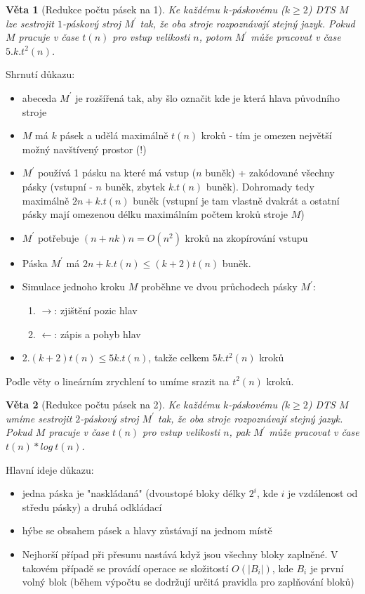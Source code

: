 \documentclass[a4paper]{article}      %
\newtheorem{theorem}{Věta}[section]
\newenvironment{proof}[1][Důkaz]{\begin{trivlist}
\item[\hskip \labelsep {\bfseries #1}]}{\end{trivlist}}
\begin{document}
\begin{theorem}[Redukce počtu pásek na 1]
Ke každému $k$-páskovému ($k \geq 2$) DTS $M$ lze sestrojit $1$-páskový stroj $M^{'}$ tak, že oba stroje rozpoznávají stejný jazyk.
Pokud  $M$ pracuje v čase $t(n)$ pro vstup velikosti $n$, potom $M^{'}$ může pracovat v čase $5.k.t^{2}(n)$.
\end{theorem}

\begin{proof}
Shrnutí důkazu:
\begin{itemize}
\item abeceda $M^{'}$ je rozšířená tak, aby šlo označit kde je která hlava původního stroje
\item $M$ má $k$ pásek a udělá maximálně $t(n)$ kroků - tím je omezen největší možný navštívený prostor (!)
\item $M^{'}$ používá 1 pásku na které má vstup ($n$ buněk) + zakódované všechny pásky (vstupní - $n$ buněk, zbytek $k.t(n)$ buněk).
Dohromady tedy maximálně $2n + k.t(n)$ buněk (vstupní je tam vlastně dvakrát a
ostatní pásky mají omezenou délku maximálním počtem kroků stroje $M$)
\item $M^{'}$ potřebuje $(n+nk)n = O(n^{2})$ kroků na zkopírování vstupu
\item Páska $M^{'}$ má $2n + k.t(n) \leq (k+2)t(n)$ buněk.
\item Simulace jednoho kroku $M$ proběhne ve dvou průchodech pásky $M^{'}$:
	\begin{enumerate}
		\item $\rightarrow$: zjištění pozic hlav
		\item $\leftarrow$: zápis a pohyb hlav
	\end{enumerate}
\item $2.(k+2)t(n) \leq 5k.t(n)$, takže celkem $5k.t^{2}(n)$ kroků
\end{itemize}
Podle věty o lineárním zrychlení to umíme srazit na $t^{2}(n)$ kroků.
\end{proof}

\begin{theorem}[Redukce počtu pásek na 2]
Ke každému $k$-páskovému ($k\geq 2$) DTS $M$ umíme sestrojit $2$-páskový stroj $M^{'}$ tak, že oba stroje rozpoznávají stejný jazyk.
Pokud $M$ pracuje v čase $t(n)$ pro vstup velikosti $n$, pak $M^{'}$ může pracovat v čase $t(n)*log\ t(n)$. 
\end{theorem}

\begin{proof}
Hlavní ideje důkazu:
\begin{itemize}
\item jedna páska je "naskládaná" (dvoustopé bloky délky $2^{i}$, kde $i$ je vzdálenost od středu pásky) a druhá odkládací
\item hýbe se obsahem pásek a hlavy zůstávají na jednom místě
\item Nejhorší případ při přesunu nastává když jsou všechny bloky zaplněné. V takovém případě se provádí operace se složitostí $O(|B_{i}|)$, kde $B_{i}$ je první volný blok (během výpočtu se dodržují určitá pravidla pro zaplňování bloků)
\end{itemize}
\end{proof}
\end{document}

